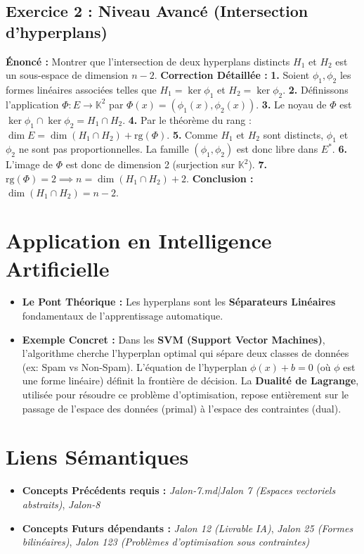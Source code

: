 \documentclass[12pt,a4paper]{report}
\begin{document}
\subsection*{Exercice 2 : Niveau Avancé (Intersection d'hyperplans)}
\textbf{Énoncé :} Montrer que l'intersection de deux hyperplans distincts $H_1$ et $H_2$ est un sous-espace de dimension $n-2$.
\textbf{Correction Détaillée :}
\textbf{1.} Soient $\phi_1, \phi_2$ les formes linéaires associées telles que $H_1 = \ker \phi_1$ et $H_2 = \ker \phi_2$.
\textbf{2.} Définissons l'application $\Phi : E \to \mathbb{K}^2$ par $\Phi(x) = (\phi_1(x), \phi_2(x))$.
\textbf{3.} Le noyau de $\Phi$ est $\ker \phi_1 \cap \ker \phi_2 = H_1 \cap H_2$.
\textbf{4.} Par le théorème du rang : $\dim E = \dim(H_1 \cap H_2) + \text{rg}(\Phi)$.
\textbf{5.} Comme $H_1$ et $H_2$ sont distincts, $\phi_1$ et $\phi_2$ ne sont pas proportionnelles. La famille $(\phi_1, \phi_2)$ est donc libre dans $E^*$.
\textbf{6.} L'image de $\Phi$ est donc de dimension 2 (surjection sur $\mathbb{K}^2$).
\textbf{7.} $\text{rg}(\Phi) = 2 \implies n = \dim(H_1 \cap H_2) + 2$.
\textbf{Conclusion :} $\dim(H_1 \cap H_2) = n - 2$.

\section{Application en Intelligence Artificielle}
\begin{itemize}
\item \textbf{Le Pont Théorique :} Les hyperplans sont les \textbf{Séparateurs Linéaires} fondamentaux de l'apprentissage automatique.
\item \textbf{Exemple Concret :} Dans les \textbf{SVM (Support Vector Machines)}, l'algorithme cherche l'hyperplan optimal qui sépare deux classes de données (ex: Spam vs Non-Spam). L'équation de l'hyperplan $\phi(x) + b = 0$ (où $\phi$ est une forme linéaire) définit la frontière de décision. La \textbf{Dualité de Lagrange}, utilisée pour résoudre ce problème d'optimisation, repose entièrement sur le passage de l'espace des données (primal) à l'espace des contraintes (dual).
\end{itemize}

\section{Liens Sémantiques}
\begin{itemize}
\item \textbf{Concepts Précédents requis :} \textit{Jalon-7.md|Jalon 7 (Espaces vectoriels abstraits)}, \textit{Jalon-8}
\item \textbf{Concepts Futurs dépendants :} \textit{Jalon 12 (Livrable IA)}, \textit{Jalon 25 (Formes bilinéaires)}, \textit{Jalon 123 (Problèmes d'optimisation sous contraintes)}
\end{itemize}
\end{document}
